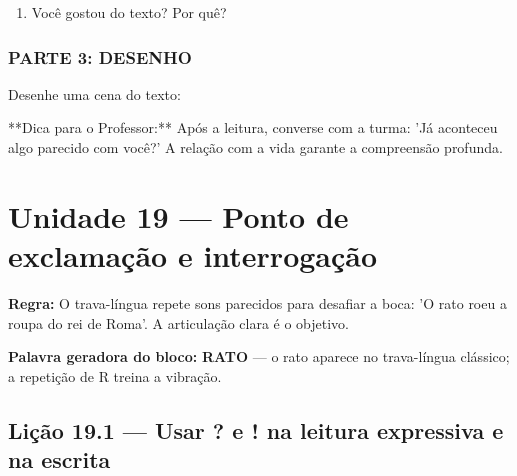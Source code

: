 \begin{exercicio}
\begin{enumerate}
  \item Você gostou do texto? Por quê?
  \begin{center}
  \underline{\hspace{12cm}}
  \end{center}

\end{enumerate}

\subsection*{PARTE 3: DESENHO}

Desenhe uma cena do texto:

\begin{center}
\end{center}

\end{exercicio}

\begin{dica}
**Dica para o Professor:** Após a leitura, converse com a turma: 'Já aconteceu algo parecido com você?' A relação com a vida garante a compreensão profunda.
\end{dica}


\chapter{Unidade 19 --- Ponto de exclamação e interrogação}


\textbf{Regra:} O trava-língua repete sons parecidos para desafiar a boca: 'O rato roeu a roupa do rei de Roma'. A articulação clara é o objetivo.

\textbf{Palavra geradora do bloco:} \textbf{RATO} --- o rato aparece no trava-língua clássico; a repetição de R treina a vibração.

\section{Lição 19.1 --- Usar ? e ! na leitura expressiva e na escrita}

